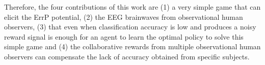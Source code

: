 \documentclass[journal]{IEEEtran}
\begin{document}
Therefore, the four contributions of this work are (1) a very simple game that can elicit the ErrP potential, (2) the EEG brainwaves from observational human observers, (3) that even when classification accuracy is low and produces a noisy reward signal is enough for an agent to learn the optimal policy to solve this simple game and (4) the collaborative rewards from multiple observational human observers can compensate the lack of accuracy obtained from specific subjects.


%
%



%
%
\end{document}
